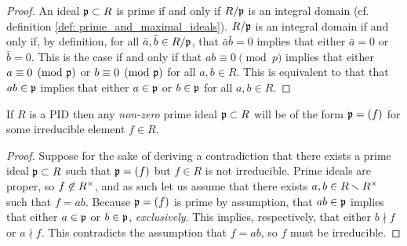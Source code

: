             \begin{proof}
                An ideal $\mathfrak{p} \subset R$ is prime if and only if $R/\mathfrak{p}$ is an integral domain (cf. definition \ref{def: prime_and_maximal_ideals}). $R/\mathfrak{p}$ is an integral domain if and only if, by definition, for all $\bar{a}, \bar{b} \in R/\mathfrak{p}$, that $\bar{a} \bar{b} = 0$ implies that either $\bar{a} = 0$ or $\bar{b} = 0$. This is the case if and only if that $ab \equiv 0 \pmod{p}$ implies that either $a \equiv 0 \pmod{\mathfrak{p}}$ or $b \equiv 0 \pmod{\mathfrak{p}}$ for all $a, b \in R$. This is equivalent to that that $ab \in \mathfrak{p}$ implies that either $a \in \mathfrak{p}$ or $b \in \mathfrak{p}$ for all $a, b \in R$.
            \end{proof}
        \begin{lemma} \label{lemma: prime_ideals_of_PIDs}
            If $R$ is a PID then any \textit{non-zero} prime ideal $\mathfrak{p} \subset R$ will be of the form $\mathfrak{p} = (f)$ for some irreducible element $f \in R$.  
        \end{lemma}
            \begin{proof}
                Suppose for the sake of deriving a contradiction that there exists a prime ideal $\mathfrak{p} \subset R$ such that $\mathfrak{p} = (f)$ but $f \in R$ is not irreducible. Prime ideals are proper, so $f \not \in R^{\x}$, and as such let us assume that there exists $a, b \in R \setminus R^{\x}$ such that $f = ab$. Because $\mathfrak{p} = (f)$ is prime by assumption, that $ab \in \mathfrak{p}$ implies that either $a \in \mathfrak{p}$ or $b \in \mathfrak{p}$, \textit{exclusively}. This implies, respectively, that either $b \nmid f$ or $a \nmid f$. This contradicts the assumption that $f = ab$, so $f$ must be irreducible.
            \end{proof}

